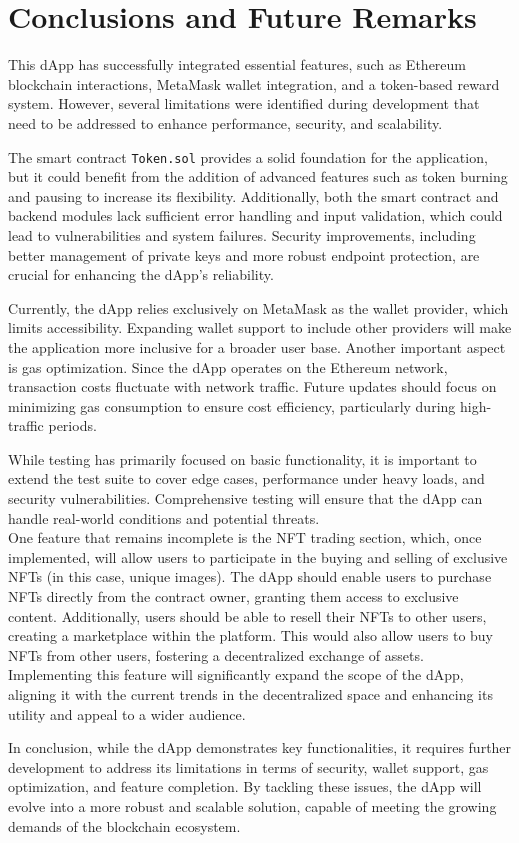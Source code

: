 \documentclass[../main.tex]{subfiles}
\begin{document}
\section{Conclusions and Future Remarks}\label{sec:conclusions}
This dApp has successfully integrated essential features, such as Ethereum blockchain interactions, MetaMask wallet integration, and a token-based reward system. However, several limitations were identified during development that need to be addressed to enhance performance, security, and scalability.

The smart contract \texttt{Token.sol} provides a solid foundation for the application, but it could benefit from the addition of advanced features such as token burning and pausing to increase its flexibility. Additionally, both the smart contract and backend modules lack sufficient error handling and input validation, which could lead to vulnerabilities and system failures. Security improvements, including better management of private keys and more robust endpoint protection, are crucial for enhancing the dApp’s reliability.

Currently, the dApp relies exclusively on MetaMask as the wallet provider, which limits accessibility. Expanding wallet support to include other providers will make the application more inclusive for a broader user base. Another important aspect is gas optimization. Since the dApp operates on the Ethereum network, transaction costs fluctuate with network traffic. Future updates should focus on minimizing gas consumption to ensure cost efficiency, particularly during high-traffic periods.

While testing has primarily focused on basic functionality, it is important to extend the test suite to cover edge cases, performance under heavy loads, and security vulnerabilities. Comprehensive testing will ensure that the dApp can handle real-world conditions and potential threats.\\

One feature that remains incomplete is the NFT trading section, which, once implemented, will allow users to participate in the buying and selling of exclusive NFTs (in this case, unique images). The dApp should enable users to purchase NFTs directly from the contract owner, granting them access to exclusive content. Additionally, users should be able to resell their NFTs to other users, creating a marketplace within the platform. This would also allow users to buy NFTs from other users, fostering a decentralized exchange of assets. Implementing this feature will significantly expand the scope of the dApp, aligning it with the current trends in the decentralized space and enhancing its utility and appeal to a wider audience.

In conclusion, while the dApp demonstrates key functionalities, it requires further development to address its limitations in terms of security, wallet support, gas optimization, and feature completion. By tackling these issues, the dApp will evolve into a more robust and scalable solution, capable of meeting the growing demands of the blockchain ecosystem.
\end{document}
